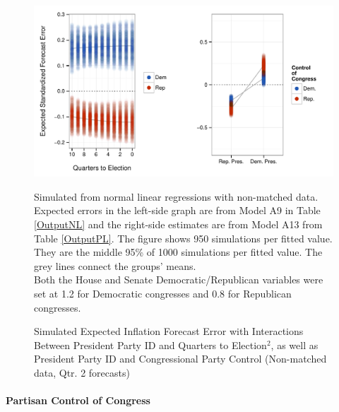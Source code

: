 \documentclass[a4paper]{article}\usepackage{graphicx, color}
\newenvironment{knitrout}{}{} %
\begin{document}
\begin{figure}[t]
    \caption{Simulated Expected Inflation Forecast Error with Interactions Between President Party ID and Quarters to Election$^{2}$, as well as President Party ID and Congressional Party Control (Non-matched data, Qtr. 2 forecasts)}
    \label{InterPlot}
    \begin{center}

\begin{knitrout}
\color{fgcolor}

{\centering \includegraphics[width=0.95\linewidth]{figure/InterPlot} 

}



\end{knitrout}


    \end{center}
    \begin{singlespace}
        {\scriptsize{Simulated from normal linear regressions with non-matched data. Expected errors in the left-side graph are from Model A9 in Table \ref{OutputNL} and the right-side estimates are from Model A13 from Table \ref{OutputPL}. The figure shows 950 simulations per fitted value. They are the middle 95\% of 1000 simulations per fitted value. The grey lines connect the groups' means.  \\ Both the House and Senate Democratic/Republican variables were set at 1.2 for Democratic congresses and 0.8 for Republican congresses.}}
    \end{singlespace}
\end{figure}

\paragraph{Partisan Control of Congress}
\end{document}
